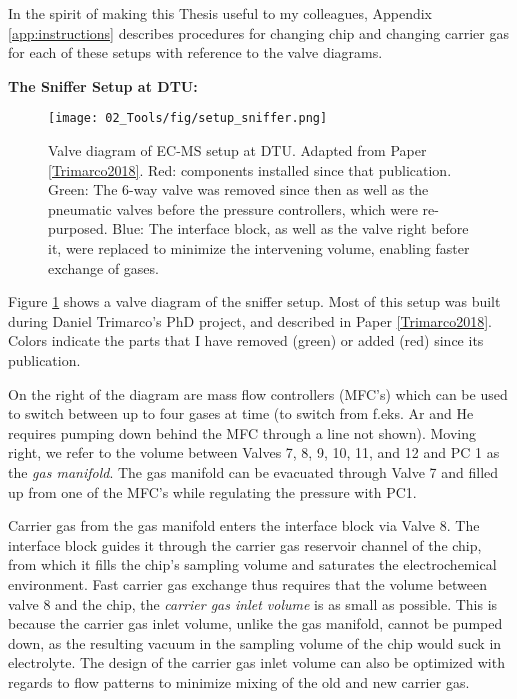 In the spirit of making this Thesis useful to my colleagues, Appendix \ref{app:instructions} describes procedures for changing chip and changing carrier gas for each of these setups with reference to the valve diagrams.

\vspace{1cm}
\textbf{\large The Sniffer Setup at DTU:}

\begin{figure}[h!]
	\texttt{[image: 02\_Tools/fig/setup\_sniffer.png]}
	\caption{Valve diagram of EC-MS setup at DTU. Adapted from Paper \ref{Trimarco2018}. Red: components installed since that publication. Green: The 6-way valve was removed since then as well as the pneumatic valves before the pressure controllers, which were re-purposed. Blue: The interface block, as well as the valve right before it, were replaced to minimize the intervening volume, enabling faster exchange of gases.}
	\label{fig:sniffer}
\end{figure}
Figure \ref{fig:sniffer} shows a valve diagram of the sniffer setup. Most of this setup was built during Daniel Trimarco's PhD project\cite{Trimarco2017_PhD}, and described in Paper \ref{Trimarco2018}. Colors indicate the parts that I have removed (green) or added (red) since its publication.

On the right of the diagram are mass flow controllers (MFC's) which can be used to switch between up to four gases at time (to switch from f.eks. Ar and He requires pumping down behind the MFC through a line not shown). Moving right, we refer to the volume between Valves 7, 8, 9, 10, 11, and 12 and PC 1 as the \textit{gas manifold}. The gas manifold can be evacuated through Valve 7 and filled up from one of the MFC's while regulating the pressure with PC1.

Carrier gas from the gas manifold enters the interface block via Valve 8. The interface block guides it through the carrier gas reservoir channel of the chip, from which it fills the chip's sampling volume and saturates the electrochemical environment. Fast carrier gas exchange thus requires that the volume between valve 8 and the chip, the \textit{carrier gas inlet volume} is as small as possible. This is because the carrier gas inlet volume, unlike the gas manifold, cannot be pumped down, as the resulting vacuum in the sampling volume of the chip would suck in electrolyte. The design of the carrier gas inlet volume can also be optimized with regards to flow patterns to minimize mixing of the old and new carrier gas. 

